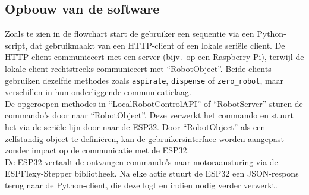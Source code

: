 \subsection{Opbouw van de software}

Zoals te zien in de flowchart start de gebruiker een sequentie via een Python-script, dat gebruikmaakt van een HTTP-client of een lokale seriële client. De HTTP-client communiceert met een server (bijv.\ op een Raspberry Pi), terwijl de lokale client rechtstreeks communiceert met ``RobotObject''. Beide clients gebruiken dezelfde methodes zoals \texttt{aspirate}, \texttt{dispense} of \texttt{zero\_robot}, maar verschillen in hun onderliggende communicatielaag.
\\[12pt]De opgeroepen methodes in ``LocalRobotControlAPI'' of ``RobotServer'' sturen de commando's door naar ``RobotObject''. Deze verwerkt het commando en stuurt het via de seriële lijn door naar de ESP32. Door ``RobotObject'' als een zelfstandig object te definiëren, kan de gebruikersinterface worden aangepast zonder impact op de communicatie met de ESP32.
\\[12pt]De ESP32 vertaalt de ontvangen commando’s naar motoraansturing via de ESPFlexy-Stepper bibliotheek. Na elke actie stuurt de ESP32 een JSON-respons terug naar de Python-client, die deze logt en indien nodig verder verwerkt.

